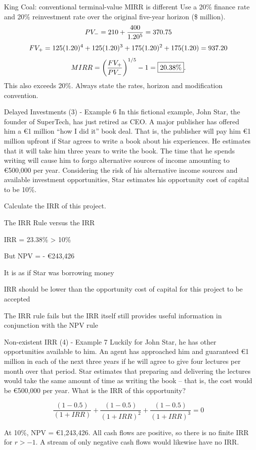 \documentclass[9pt,aspectratio=169]{beamer}
\newenvironment{wideitemize}{\itemize\addtolength{\itemsep}{10pt}}{\enditemize}
\begin{document}
\begin{frame}{King Coal: conventional terminal-value MIRR is different}
Use a 20\% finance rate and 20\% reinvestment rate over the original five-year horizon (\$ million).
\[
PV_- =210+\frac{400}{1.20^5}=370.75
\]
\[
FV_+ =125(1.20)^4+125(1.20)^3+175(1.20)^2+175(1.20)=937.20
\]
\[
MIRR=\left(\frac{FV_+}{PV_-}\right)^{1/5}-1=\boxed{20.38\%}.
\]
This also exceeds 20\%. Always state the rates, horizon and modification convention.
\end{frame}

\begin{frame}{Delayed Investments (3) - Example 6}
In this fictional example, John Star, the founder of SuperTech, has just retired as CEO. A major publisher has offered him a €1 million ``how I did it'' book deal. That is, the publisher will pay him €1 million upfront if Star agrees to write a book about his experiences. He estimates that it will take him three years to write the book. The time that he spends writing will cause him to forgo alternative sources of income amounting to €500,000 per year. Considering the risk of his alternative income sources and available investment opportunities, Star estimates his opportunity cost of capital to be 10\%.

Calculate the IRR of this project.
\end{frame}

\begin{frame}{The IRR Rule versus the IRR}
\begin{wideitemize}
\item IRR = 23.38\% > 10\%
\item But NPV = - €243,426
\item It is as if Star was borrowing money
\item IRR should be lower than the opportunity cost of capital for this project to be accepted
\item The IRR rule fails but the IRR itself still provides useful information in conjunction with the NPV rule
\end{wideitemize}
\end{frame}

\begin{frame}{Non-existent IRR (4) - Example 7}
Luckily for John Star, he has other opportunities available to him. An agent has approached him and guaranteed €1 million in each of the next three years if he will agree to give four lectures per month over that period. Star estimates that preparing and delivering the lectures would take the same amount of time as writing the book – that is, the cost would be €500,000 per year. What is the IRR of this opportunity?

$$\frac{(1 - 0.5)}{(1 + IRR)} + \frac{(1 - 0.5)}{(1 + IRR)^2} + \frac{(1 - 0.5)}{(1 + IRR)^3} = 0$$

At 10\%, NPV = €1,243,426. All cash flows are positive, so there is no finite IRR for $r>-1$. A stream of only negative cash flows would likewise have no IRR.
\end{frame}
\end{document}
